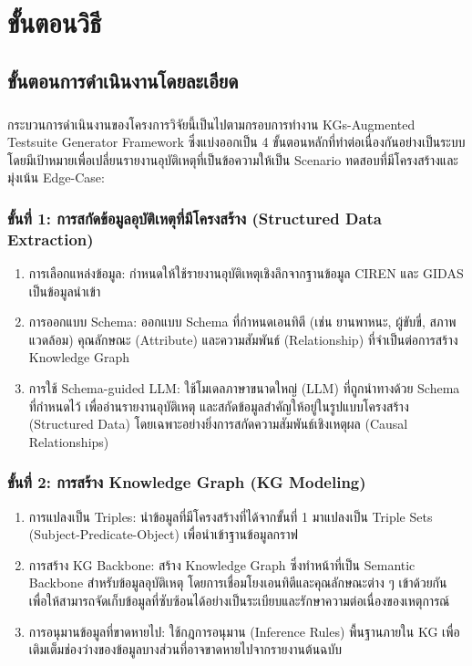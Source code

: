 \chapter{ขั้นตอนวิธี}\label{ch:methodology}

\section{ขั้นตอนการดำเนินงานโดยละเอียด}\label{sec:ch4_methodology}
\paragraph{}

กระบวนการดำเนินงานของโครงการวิจัยนี้เป็นไปตามกรอบการทำงาน KGs-Augmented Testsuite Generator Framework ซึ่งแบ่งออกเป็น 4 ขั้นตอนหลักที่ทำต่อเนื่องกันอย่างเป็นระบบ โดยมีเป้าหมายเพื่อเปลี่ยนรายงานอุบัติเหตุที่เป็นข้อความให้เป็น Scenario ทดสอบที่มีโครงสร้างและมุ่งเน้น Edge-Case:

\subsection{ขั้นที่ 1: การสกัดข้อมูลอุบัติเหตุที่มีโครงสร้าง (Structured Data Extraction)}\label{subsec:ch4_data_extraction}

\begin{enumerate}
    \item การเลือกแหล่งข้อมูล: กำหนดให้ใช้รายงานอุบัติเหตุเชิงลึกจากฐานข้อมูล CIREN และ GIDAS เป็นข้อมูลนำเข้า
    \item การออกแบบ Schema: ออกแบบ Schema ที่กำหนดเอนทิตี (เช่น ยานพาหนะ, ผู้ขับขี่, สภาพแวดล้อม) คุณลักษณะ (Attribute) และความสัมพันธ์ (Relationship) ที่จำเป็นต่อการสร้าง Knowledge Graph
    \item การใช้ Schema-guided LLM: ใช้โมเดลภาษาขนาดใหญ่ (LLM) ที่ถูกนำทางด้วย Schema ที่กำหนดไว้ เพื่ออ่านรายงานอุบัติเหตุ และสกัดข้อมูลสำคัญให้อยู่ในรูปแบบโครงสร้าง (Structured Data) โดยเฉพาะอย่างยิ่งการสกัดความสัมพันธ์เชิงเหตุผล (Causal Relationships)
\end{enumerate}

\subsection{ขั้นที่ 2: การสร้าง Knowledge Graph (KG Modeling)}\label{subsec:ch4_kg_modeling}

\begin{enumerate}
    \item การแปลงเป็น Triples: นำข้อมูลที่มีโครงสร้างที่ได้จากขั้นที่ 1 มาแปลงเป็น Triple Sets (Subject-Predicate-Object) เพื่อนำเข้าฐานข้อมูลกราฟ
    \item การสร้าง KG Backbone: สร้าง Knowledge Graph ซึ่งทำหน้าที่เป็น Semantic Backbone สำหรับข้อมูลอุบัติเหตุ โดยการเชื่อมโยงเอนทิตีและคุณลักษณะต่าง ๆ เข้าด้วยกัน เพื่อให้สามารถจัดเก็บข้อมูลที่ซับซ้อนได้อย่างเป็นระเบียบและรักษาความต่อเนื่องของเหตุการณ์
    \item การอนุมานข้อมูลที่ขาดหายไป: ใช้กฎการอนุมาน (Inference Rules) พื้นฐานภายใน KG เพื่อเติมเต็มช่องว่างของข้อมูลบางส่วนที่อาจขาดหายไปจากรายงานต้นฉบับ
\end{enumerate}

